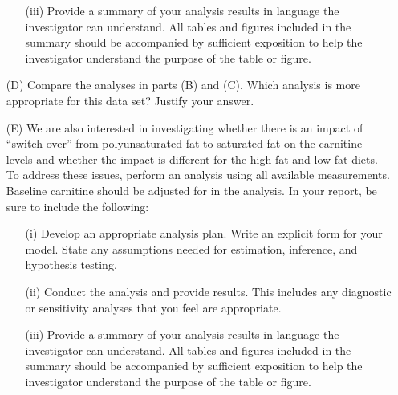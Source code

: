 \begin{itemize}
\begin{itemize}
													\vspace{0.2cm}
												  \item[(iii)] Provide a summary of your analysis results in language the investigator can understand. All tables 
																			 and figures included in the summary should be accompanied by sufficient exposition to help the 
																			 investigator understand the purpose of the table or figure. 		
											   \end{itemize}						
							
							
								\vspace{0.2cm}
								\item[(D)] Compare the analyses in parts (B) and (C). Which analysis is more appropriate for this data set? Justify your answer.							
							
								\vspace{0.2cm}
								\item[(E)] We are also interested in investigating whether there is an impact of ``switch-over'' from polyunsaturated fat 
													 to saturated fat on the carnitine levels and whether the impact is different for the high fat and low fat diets. 
													 To address these issues, perform an analysis using all available measurements. Baseline carnitine should be 
													 adjusted for in the analysis. In your report, be sure to include the following:
							
													\begin{itemize}
													\vspace{0.2cm}
													\item[(i)] Develop an appropriate analysis plan. Write an explicit form for your model.
																		 State any assumptions needed for estimation, inference, and hypothesis testing.
	
													\vspace{0.2cm}
												  \item[(ii)] Conduct the analysis and provide results.	This includes any diagnostic or sensitivity analyses
																			that you feel are appropriate.
													
													\vspace{0.2cm}
												  \item[(iii)] Provide a summary of your analysis results in language the investigator can understand. All tables 
																			 and figures included in the summary should be accompanied by sufficient exposition to help the 
																			 investigator understand the purpose of the table or figure. 		
											   \end{itemize}								

   \end{itemize}	
				
